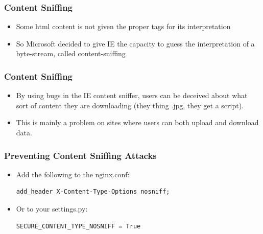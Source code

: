 \documentclass[9pt]{beamer}
\begin{document}

\begin{frame}[fragile]
\frametitle{Content Sniffing}
\begin{itemize}
\item Some html content is not given the proper tags for its interpretation
\pause
\item So Microsoft decided to give IE the capacity to guess the interpretation of a byte-stream, called content-sniffing
\end{itemize}
\end{frame}

\begin{frame}[fragile]
\frametitle{Content Sniffing}
\begin{itemize}
\item By using bugs in the IE content sniffer, users can be deceived about what sort of content they are downloading (they thing .jpg, they get a script).
\pause
\item This is mainly a problem on sites where users can both upload and download data.
\end{itemize}
\end{frame}

\begin{frame}[fragile]
\frametitle{Preventing Content Sniffing Attacks}
\begin{itemize}
\item Add the following to the nginx.conf:
\begin{verbatim}
add_header X-Content-Type-Options nosniff;
\end{verbatim}
\pause
\item Or to your settings.py:
\begin{verbatim}
SECURE_CONTENT_TYPE_NOSNIFF = True
\end{verbatim}
\end{itemize}
\end{frame}
\end{document}
